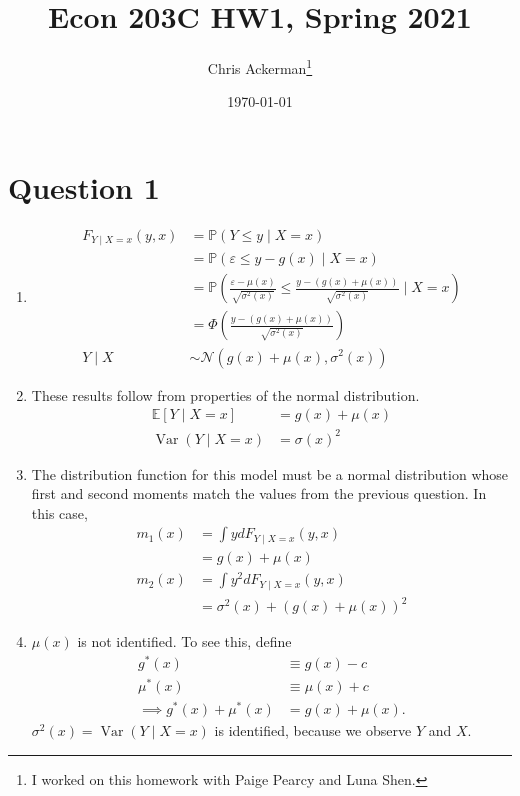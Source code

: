 \documentclass{article}
\title{Econ 203C HW1, Spring 2021}
\author{Chris Ackerman\thanks{I worked on this homework with Paige Pearcy and Luna Shen.}}
\date{\today}
\newcommand{\p}{\mathbb{P}}
\newcommand{\E}{\mathbb{E}}
\newcommand{\Var}{\operatorname{Var}}
\begin{document}
\maketitle
\newpage
\section*{Question 1}
\begin{enumerate}
\item 
  \begin{align*}
    F_{Y \mid X = x} (y, x) &= \p (Y \le y \mid X = x)\\
                            &= \p ( \varepsilon \le y - g(x) \mid X = x)\\
                            &= \p \left(\frac{\varepsilon - \mu(x)}{\sqrt{\sigma^2(x)}} \le \frac{y - (g(x) + \mu (x))}{\sqrt{\sigma^2(x)}} \mid X = x\right)\\
                            &= \Phi \left(\frac{y - (g(x) + \mu (x))}{\sqrt{\sigma^2(x)}}\right)\\
    Y \mid X &\sim \mathcal{N} (g(x) + \mu (x), \sigma^2 (x))
  \end{align*}
\item
  These results follow from properties of the normal distribution.
  \begin{align*}
    \E[Y \mid X = x] &= g(x) + \mu (x)\\
    \Var (Y \mid X = x) &= \sigma(x)^2
  \end{align*}
  \item The distribution function for this model must be a normal distribution whose first and second moments match the values from the previous question. In this case,
    \begin{align*}
      m_1(x) &= \int y dF_{Y \mid X = x} (y, x) \tag{first moment}\\
             &= g(x) + \mu (x)\\
      m_2(x) &= \int y^2 dF_{Y \mid X = x}(y, x) \tag{second moment}\\
      &= \sigma^2(x) + (g(x) + \mu(x))^2
    \end{align*}
    
  \item $\mu (x)$ is not identified. To see this, define
    \begin{align*}
      g^\ast (x) &\equiv g(x) - c\\
      \mu^\ast (x) &\equiv \mu (x) + c\\
      \implies g^\ast(x) + \mu^\ast(x) &= g(x) + \mu(x).
    \end{align*}
    $\sigma^2(x) = \Var(Y \mid X = x)$ is identified, because we observe $Y$ and $X$.
\end{enumerate}
\end{document}
